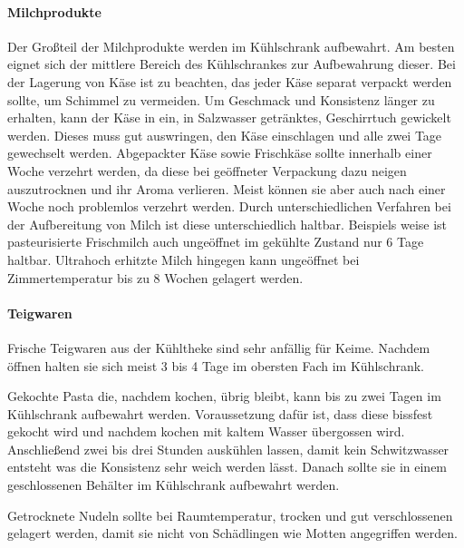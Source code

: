  \paragraph{Milchprodukte}
Der Großteil der Milchprodukte werden im Kühlschrank aufbewahrt. Am besten eignet sich der mittlere Bereich des Kühlschrankes zur Aufbewahrung dieser. Bei der Lagerung von Käse ist zu beachten, das jeder Käse separat verpackt werden sollte, um Schimmel zu vermeiden. Um Geschmack und Konsistenz länger zu erhalten, kann der Käse in ein, in Salzwasser getränktes, Geschirrtuch gewickelt werden. Dieses muss gut auswringen, den Käse einschlagen 
und alle zwei Tage gewechselt werden. Abgepackter Käse sowie Frischkäse sollte innerhalb einer Woche verzehrt werden, da diese bei geöffneter Verpackung dazu neigen auszutrocknen und ihr Aroma verlieren. Meist können sie aber auch nach einer Woche noch problemlos verzehrt werden. Durch unterschiedlichen Verfahren bei der Aufbereitung von Milch ist diese unterschiedlich haltbar. Beispiels weise ist pasteurisierte Frischmilch auch ungeöffnet im gekühlte Zustand nur 6 Tage haltbar. Ultrahoch erhitzte Milch hingegen kann ungeöffnet bei Zimmertemperatur bis zu 8 Wochen gelagert werden. %

 \paragraph{Teigwaren}
Frische Teigwaren aus der Kühltheke sind sehr anfällig für Keime. Nachdem öffnen halten sie sich meist 3 bis 4 Tage im obersten Fach im Kühlschrank. 

Gekochte Pasta die, nachdem kochen, übrig bleibt, kann bis zu zwei Tagen im Kühlschrank aufbewahrt werden. Voraussetzung dafür ist, dass diese bissfest gekocht wird und nachdem kochen mit kaltem Wasser übergossen wird. Anschließend zwei bis drei Stunden auskühlen lassen, damit kein Schwitzwasser entsteht was die Konsistenz sehr weich werden lässt. Danach sollte sie in einem geschlossenen Behälter im Kühlschrank aufbewahrt werden. 

Getrocknete Nudeln sollte bei Raumtemperatur, trocken und gut verschlossenen gelagert werden, damit sie nicht von Schädlingen wie Motten angegriffen werden. %

